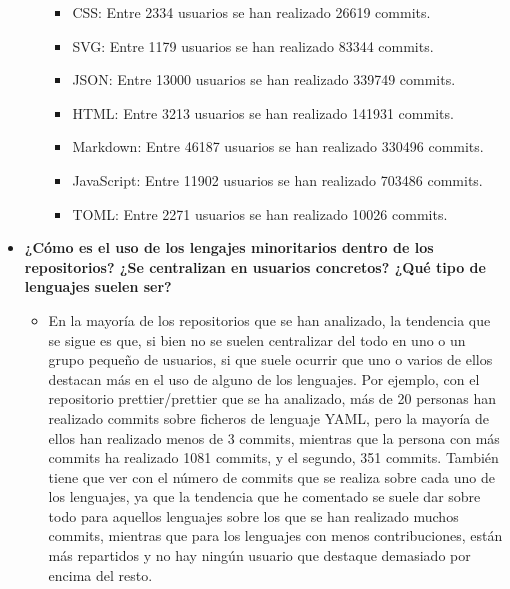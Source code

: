 \documentclass[a4paper, 12pt]{book}
\begin{document}
\begin{itemize}
\begin{itemize}
\begin{itemize}
                  \item CSS: Entre 2334 usuarios se han realizado 26619 commits.
                  \item SVG: Entre 1179 usuarios se han realizado 83344 commits.
                  \item JSON: Entre 13000 usuarios se han realizado 339749 commits.
                  \item HTML: Entre 3213 usuarios se han realizado 141931 commits.
                  \item Markdown: Entre 46187 usuarios se han realizado 330496 commits.
                  \item JavaScript: Entre 11902 usuarios se han realizado 703486 commits.
                  \item TOML: Entre 2271 usuarios se han realizado 10026 commits.
                \end{itemize}
        \end{itemize}
  \item \textbf{¿Cómo es el uso de los lengajes minoritarios dentro de los repositorios? ¿Se centralizan en usuarios concretos? ¿Qué tipo de lenguajes suelen ser?}
        \begin{itemize}
          \item En la mayoría de los repositorios que se han analizado, la tendencia que se sigue es que, si bien no se suelen centralizar del todo en uno o un grupo pequeño de usuarios, si que suele ocurrir que uno o varios de ellos destacan más en el uso de alguno de los lenguajes. Por ejemplo, con el repositorio prettier/prettier que se ha analizado, más de 20 personas han realizado commits sobre ficheros de lenguaje YAML, pero la mayoría de ellos han realizado menos de 3 commits, mientras que la persona con más commits ha realizado 1081 commits, y el segundo, 351 commits. También tiene que ver con el número de commits que se realiza sobre cada uno de los lenguajes, ya que la tendencia que he comentado se suele dar sobre todo para aquellos lenguajes sobre los que se han realizado muchos commits, mientras que para los lenguajes con menos contribuciones, están más repartidos y no hay ningún usuario que destaque demasiado por encima del resto.
          

\end{itemize}
\end{itemize}
\end{document}
